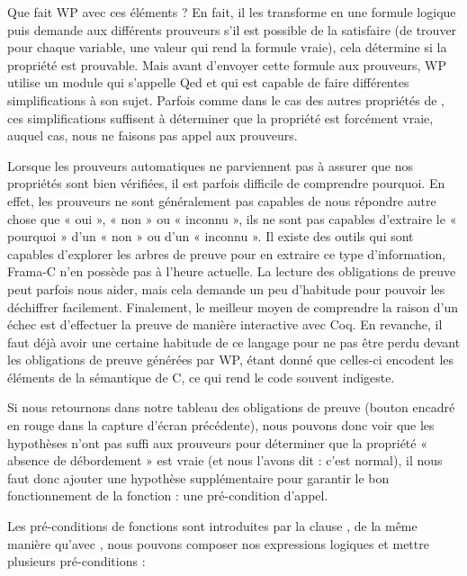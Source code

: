 \documentclass[middle]{zmdocument}
\begin{document}
Que fait WP avec ces éléments ? En fait, il les transforme en une formule 
logique puis demande aux différents prouveurs s'il est possible de la 
satisfaire (de trouver pour chaque variable, une valeur qui rend la formule 
vraie), cela détermine si la propriété est prouvable. Mais avant d'envoyer 
cette formule aux prouveurs, WP utilise un module qui s'appelle Qed et qui est
capable de faire différentes simplifications à son sujet. Parfois comme dans 
le cas des autres propriétés de , ces simplifications suffisent à 
déterminer que la propriété est forcément vraie, auquel cas, nous ne faisons
pas appel aux prouveurs.



Lorsque les prouveurs automatiques ne parviennent pas à assurer que nos 
propriétés sont bien vérifiées, il est parfois difficile de comprendre 
pourquoi. En effet, les prouveurs ne sont généralement pas capables de nous 
répondre autre chose que « oui », « non » ou « inconnu », ils ne sont pas capables
d'extraire le « pourquoi » d'un « non » ou d'un « inconnu ». Il existe des outils qui
sont capables d'explorer les arbres de preuve pour en extraire ce type 
d'information, Frama-C n'en possède pas à l'heure actuelle. La lecture des
obligations de preuve peut parfois nous aider, mais cela demande un peu 
d'habitude pour pouvoir les déchiffrer facilement. Finalement, le meilleur
moyen de comprendre la raison d'un échec est d'effectuer la preuve de manière
interactive avec Coq. En revanche, il faut déjà avoir une certaine habitude de
ce langage pour ne pas être perdu devant les obligations de preuve générées par
WP, étant donné que celles-ci encodent les éléments de la sémantique de C, ce 
qui rend le code souvent indigeste.



Si nous retournons dans notre tableau des obligations de preuve (bouton 
encadré en rouge dans la capture d'écran précédente), nous pouvons donc voir
que les hypothèses n'ont pas suffi aux prouveurs pour déterminer que la
propriété  « absence de débordement » est vraie (et nous l'avons dit : c'est
normal), il nous faut donc ajouter une hypothèse supplémentaire pour garantir
le bon fonctionnement de la fonction : une pré-condition d'appel.





Les pré-conditions de fonctions sont introduites par la clause ,
de la même manière qu'avec , nous pouvons composer nos 
expressions logiques et mettre plusieurs pré-conditions :
\end{document}
